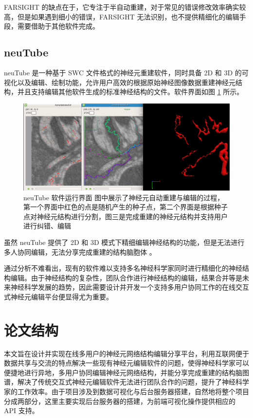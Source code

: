 FARSIGHT 的缺点在于，它专注于半自动重建，对于常见的错误修改效率确实较高，但是如果遇到细小的错误，FARSIGHT 无法识别，也不提供精细化的编辑手段，需要借助于其他软件完成。

\subsection{neuTube}
neuTube 是一种基于 SWC 文件格式的神经元重建软件，同时具备 2D 和 3D 的可视化以及编辑、绘制功能，允许用户高效的根据原始神经图像数据重建神经元结构，并且支持编辑其他软件生成的标准神经结构的文件。软件界面如图 \ref{neutube} 所示。

\begin{figure}[!ht]
\centering
\includegraphics[width=148mm]{images/neutube}
\caption{neuTube 软件运行界面 图中展示了神经元自动重建与编辑的过程，第一个界面中红色的点是随机产生的种子点，第二个界面是根据种子点对神经元结构进行分割，图三是完成重建的神经元结构并支持用户进行纠错、编辑}
\label{neutube}
\end{figure}

虽然 neuTube 提供了 2D 和 3D 模式下精细编辑神经结构的功能，但是无法进行多人协同编辑，无法分享完成重建的结构脑胞体 。

通过分析不难看出，现有的软件难以支持多名神经科学家同时进行精细化的神经结构编辑。由于神经结构的复杂性，团队合作进行神经结构的编辑，结果合并等是未来神经科学发展的趋势，因此需要设计并开发一个支持多用户协同工作的在线交互式神经元编辑平台便显得尤为重要。

\section{论文结构}
本文旨在设计并实现在线多用户的神经元网络结构编辑分享平台，利用互联网便于数据共享与交流的特点解决一些现有神经元编辑软件的问题，使得神经科学家可以便捷地进行异地，多用户协同编辑神经元网络结构，并能分享完成重建的结构脑图谱，解决了传统交互式神经元编辑软件无法进行团队合作的问题，提升了神经科学家的工作效率。由于项目涉及到数据可视化与后台服务器搭建，自然地将整个项目分成两部分，这里主要实现后台服务器的搭建，为前端可视化操作提供相应的 API 支持。

